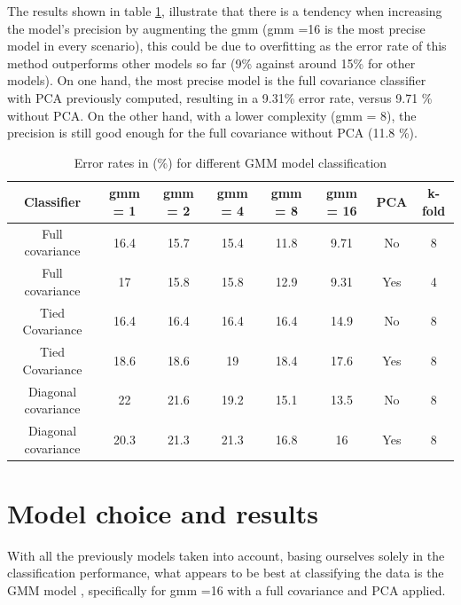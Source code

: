 \documentclass[twoside,a4paper,12pt]{report}
\begin{document}
The results shown in table \ref{errorRatesGMMs}, illustrate that there is a tendency 
when increasing the model's precision by augmenting the gmm (gmm =16 is the most precise model
in every scenario), this could be due to overfitting as the error rate of this 
method outperforms other models so far (9\% against around 15\% for other models).
 On one hand, the most precise model is the full covariance classifier with PCA previously computed,
resulting in a 9.31\% error rate, versus 9.71 \% without PCA. On the other hand, with a lower complexity (gmm = 8),
the precision is still good enough for the full covariance without PCA (11.8 \%).


\begin{table}[H]
    \centering
     \begin{tabular}{||c c c c c c c c||} 
        \hline \hline
        Classifier & gmm = 1 & gmm = 2 & gmm = 4 & gmm = 8 &gmm = 16 & PCA & k-fold\\
        \hline\hline
        Full covariance &  16.4 &  15.7 &  15.4 & \cellcolor{blue!25}  11.8 & \cellcolor{blue!25} 9.71 & No & 8  \\ 
        \hline
        Full covariance &  17 &  15.8 &  15.8 &  12.9 & \cellcolor{blue!25} 9.31 & Yes & 4  \\ 
        \hline
        Tied Covariance &  16.4 &  16.4 & 16.4 &  16.4 & 14.9  & No & 8  \\
        \hline
        Tied Covariance &  18.6 &  18.6 & 19 &  18.4 & 17.6  & Yes & 8  \\
        \hline
        Diagonal covariance  &  22 &  21.6 & 19.2 &  15.1 & 13.5  & No & 8 \\
        \hline
        Diagonal covariance &20.3 &  21.3 & 21.3&  16.8  & 16 & Yes & 8\\
        \hline \hline
    \end{tabular}
    \caption{Error rates in (\%) for different GMM model classification    \label{errorRatesGMMs}    }
\end{table}

    

\section{Model choice and results}
With all the previously models taken into account, basing ourselves solely 
in the classification performance, what appears to be best at
classifying the data is the GMM model , specifically for gmm =16 with a full covariance and PCA applied.
\end{document}
